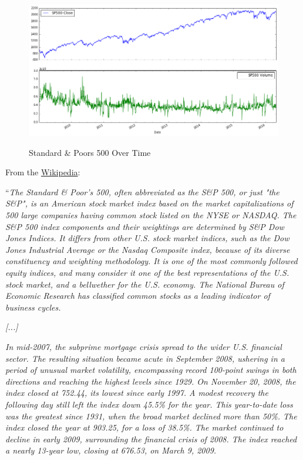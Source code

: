 \begin{figure}[bth]
  \myfloatalign
  {\includegraphics[width=1\linewidth]
    {gfx/standard-and-poors-500-over-time}}
  \caption{Standard \& Poors 500
    Over Time}
  \label{fig:standard-and-poors-500-over-time}
\end{figure}

From the
\href{https://en.wikipedia.org/wiki/S\%26P_500_Index}{Wikipedia}:

``\textit{The Standard \& Poor's 500, often abbreviated as the S\&P
  500, or just "the S\&P", is an American stock market index based on
  the market capitalizations of 500 large companies having common
  stock listed on the NYSE or NASDAQ. The S\&P 500 index components
  and their weightings are determined by S\&P Dow Jones Indices. It
  differs from other U.S. stock market indices, such as the Dow Jones
  Industrial Average or the Nasdaq Composite index, because of its
  diverse constituency and weighting methodology. It is one of the
  most commonly followed equity indices, and many consider it one of
  the best representations of the U.S. stock market, and a bellwether
  for the U.S. economy. The National Bureau of Economic Research has
  classified common stocks as a leading indicator of business cycles.}

\textit{[...]}

\textit{In mid-2007, the subprime mortgage crisis spread to the wider
  U.S. financial sector. The resulting situation became acute in
  September 2008, ushering in a period of unusual market volatility,
  encompassing record 100-point swings in both directions and reaching
  the highest levels since 1929. On November 20, 2008, the index
  closed at 752.44, its lowest since early 1997. A modest recovery the
  following day still left the index down 45.5\% for the year. This
  year-to-date loss was the greatest since 1931, when the broad market
  declined more than 50\%. The index closed the year at 903.25, for a
  loss of 38.5\%. The market continued to decline in early 2009,
  surrounding the financial crisis of 2008. The index reached a nearly
  13-year low, closing at 676.53, on March 9, 2009.}


